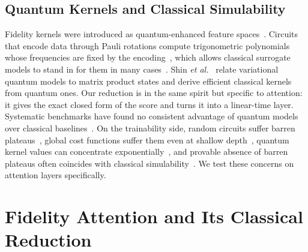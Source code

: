 \documentclass[conference]{IEEEtran}
\begin{document}
\subsection{Quantum Kernels and Classical Simulability}
Fidelity kernels were introduced as quantum-enhanced feature spaces~\cite{havlicek2019supervised,schuld2019feature}. Circuits that encode data through Pauli rotations compute trigonometric polynomials whose frequencies are fixed by the encoding~\cite{schuld2021encoding}, which allows classical surrogate models to stand in for them in many cases~\cite{schreiber2023surrogates}. Shin \emph{et al.}~\cite{shin2023dequantizing} relate variational quantum models to matrix product states and derive efficient classical kernels from quantum ones. Our reduction is in the same spirit but specific to attention: it gives the exact closed form of the score and turns it into a linear-time layer. Systematic benchmarks have found no consistent advantage of quantum models over classical baselines~\cite{bowles2024benchmarking}. On the trainability side, random circuits suffer barren plateaus~\cite{mcclean2018barren}, global cost functions suffer them even at shallow depth~\cite{cerezo2021cost}, quantum kernel values can concentrate exponentially~\cite{thanasilp2024concentration}, and provable absence of barren plateaus often coincides with classical simulability~\cite{cerezo2025simulability}. We test these concerns on attention layers specifically.

\section{Fidelity Attention and Its Classical Reduction}
\end{document}

